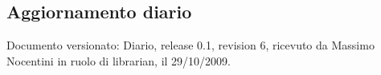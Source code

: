 \subsection{Aggiornamento diario}
Documento versionato: Diario, release 0.1, revision 6, ricevuto da Massimo 
Nocentini in ruolo di librarian, il 29/10/2009. 
